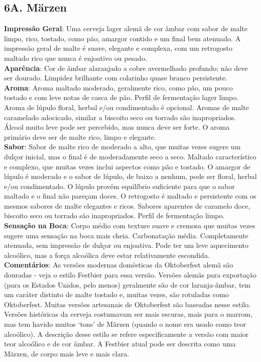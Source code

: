 \subsection*{6A. Märzen}
\textbf{Impressão Geral}: Uma cerveja lager alemã de cor âmbar com sabor de malte limpo, rico, tostado, como pão, amargor contido e um final bem atenuado. A impressão geral de malte é suave, elegante e complexa, com um retrogosto maltado rico que nunca é enjoativo ou pesado. \\
\textbf{Aparência}: Cor de âmbar alaranjado a cobre avermelhado profundo; não deve ser dourado. Limpidez brilhante com colarinho quase branco persistente. \\
\textbf{Aroma}: Aroma maltado moderado, geralmente rico, como pão, um pouco tostado e com leve notas de casca de pão. Perfil de fermentação lager limpo. Aroma de lúpulo floral, herbal e/ou condimentado é opcional. Aromas de malte caramelado adocicado, similar a biscoito seco ou torrado são inapropriados. Álcool muito leve pode ser percebido, mas nunca deve ser forte. O aroma primário deve ser de malte rico, limpo e elegante. \\
\textbf{Sabor}: Sabor de malte rico de moderado a alto, que muitas vezes sugere um dulçor inicial, mas o final é de moderadamente seco a seco. Maltado característico e complexo, que muitas vezes inclui aspectos como pão e tostado. O amargor de lúpulo é moderado e o sabor de lúpulo, de baixo a nenhum, pode ser floral, herbal e/ou condimentado. O lúpulo provém equilíbrio suficiente para que o sabor maltado e o final não pareçam doces. O retrogosto é maltado e persistente com os mesmos sabores de malte elegantes e ricos. Sabores aparentes de caramelo doce, biscoito seco ou torrado são inapropriados. Perfil de fermentação limpo. \\
\textbf{Sensação na Boca}: Corpo médio com texture suave e cremosa que muitas vezes sugere uma sensação na boca mais cheia. Carbonatação média. Completamente atenuada, sem impressão de dulçor ou enjoativa. Pode ter um leve aquecimento alcoólico, mas a força alcoólica deve estar relativamente escondida. \\
\textbf{Comentários}: As versões modernas domésticas da Oktoberfest alemã são douradas - veja o estilo Festbier para essa versão. Versões alemãs para exportação (para os Estados Unidos, pelo menos) geralmente são de cor laranja-âmbar, tem um caráter distinto de malte tostado e, muitas vezes, são rotuladas como Oktoberfest. Muitas versões artesanais de Oktoberfest são baseadas nesse estilo. Versões históricas da cerveja costumavam ser mais escuras, mais para o marrom, mas tem havido muitos ‘tons’ de Mãrzen (quando o nome era usado como teor alcoólico). A descrição desse estilo se refere especificamente a versão com maior teor alcoólico e de cor âmbar. A Festbier atual pode ser descrita como uma Märzen, de corpo mais leve e mais clara. \\
